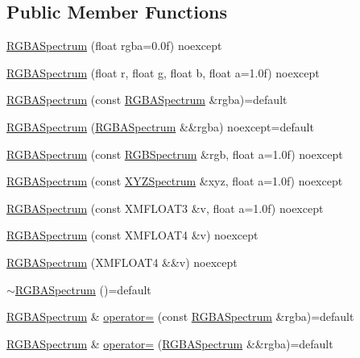 \subsection*{Public Member Functions}
\begin{DoxyCompactItemize}
\item 
\hyperlink{structmage_1_1_r_g_b_a_spectrum_ac19101586f3a587fe6cb2b26eade845d}{R\+G\+B\+A\+Spectrum} (float rgba=0.\+0f) noexcept
\item 
\hyperlink{structmage_1_1_r_g_b_a_spectrum_a0b1c8dcaacee8d6ba17f3cf0895a1595}{R\+G\+B\+A\+Spectrum} (float r, float g, float b, float a=1.\+0f) noexcept
\item 
\hyperlink{structmage_1_1_r_g_b_a_spectrum_ab51c4feb24b10a01c8961b2ed33f6185}{R\+G\+B\+A\+Spectrum} (const \hyperlink{structmage_1_1_r_g_b_a_spectrum}{R\+G\+B\+A\+Spectrum} \&rgba)=default
\item 
\hyperlink{structmage_1_1_r_g_b_a_spectrum_ac53917f6129baafb04d812fcef6e4f56}{R\+G\+B\+A\+Spectrum} (\hyperlink{structmage_1_1_r_g_b_a_spectrum}{R\+G\+B\+A\+Spectrum} \&\&rgba) noexcept=default
\item 
\hyperlink{structmage_1_1_r_g_b_a_spectrum_a839b51be19e75f98ab068d6e16673860}{R\+G\+B\+A\+Spectrum} (const \hyperlink{structmage_1_1_r_g_b_spectrum}{R\+G\+B\+Spectrum} \&rgb, float a=1.\+0f) noexcept
\item 
\hyperlink{structmage_1_1_r_g_b_a_spectrum_a095eba2f33b2c82cacb4b3665b9e8641}{R\+G\+B\+A\+Spectrum} (const \hyperlink{structmage_1_1_x_y_z_spectrum}{X\+Y\+Z\+Spectrum} \&xyz, float a=1.\+0f) noexcept
\item 
\hyperlink{structmage_1_1_r_g_b_a_spectrum_a81179406fd585eefb377e163b3b12771}{R\+G\+B\+A\+Spectrum} (const X\+M\+F\+L\+O\+A\+T3 \&v, float a=1.\+0f) noexcept
\item 
\hyperlink{structmage_1_1_r_g_b_a_spectrum_ae6c70539a602c52a9952a2c1fa5fa2ed}{R\+G\+B\+A\+Spectrum} (const X\+M\+F\+L\+O\+A\+T4 \&v) noexcept
\item 
\hyperlink{structmage_1_1_r_g_b_a_spectrum_a623c661a4c99fddc271e994ea4fd3c2f}{R\+G\+B\+A\+Spectrum} (X\+M\+F\+L\+O\+A\+T4 \&\&v) noexcept
\item 
\hyperlink{structmage_1_1_r_g_b_a_spectrum_a0b30d3cdb54965f4e9524904ed5fbf85}{$\sim$\+R\+G\+B\+A\+Spectrum} ()=default
\item 
\hyperlink{structmage_1_1_r_g_b_a_spectrum}{R\+G\+B\+A\+Spectrum} \& \hyperlink{structmage_1_1_r_g_b_a_spectrum_a1b9910f5ce9cb368b88e1b02fb4c4c72}{operator=} (const \hyperlink{structmage_1_1_r_g_b_a_spectrum}{R\+G\+B\+A\+Spectrum} \&rgba)=default
\item 
\hyperlink{structmage_1_1_r_g_b_a_spectrum}{R\+G\+B\+A\+Spectrum} \& \hyperlink{structmage_1_1_r_g_b_a_spectrum_ae23c094db4110804cf4b3bc0a00af131}{operator=} (\hyperlink{structmage_1_1_r_g_b_a_spectrum}{R\+G\+B\+A\+Spectrum} \&\&rgba)=default
\end{DoxyCompactItemize}


